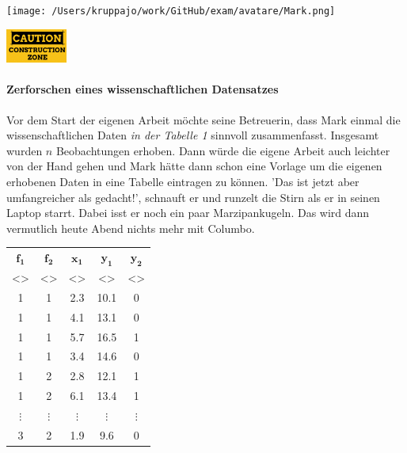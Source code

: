 \documentclass[a4paper, 9pt]{scrartcl}\usepackage[]{graphicx}\usepackage[]{xcolor}
\begin{document}
 
\ifcollection
\begin{flushright}
\tiny\vspace{-3Ex}
\textbf{\examinhaltstart}
\exammodulebiostat
\vspace{-4Ex}
\end{flushright}
\begin{minipage}[t]{0.5\textwidth}
\texttt{[image: /Users/kruppajo/work/GitHub/exam/avatare/Mark.png]}
\end{minipage}
\begin{minipage}[t]{0.5\textwidth}
\hfill
\href{https://youtu.be/C9skfFRTHhI}{\includegraphics[width = 2cm]{img/caution}}
\end{minipage}
\fi



\ifcollection
\paragraph{Zerforschen eines wissenschaftlichen Datensatzes}
\fi

Vor dem Start der eigenen Arbeit möchte seine Betreuerin, dass Mark einmal die wissenschaftlichen Daten \textit{in der Tabelle 1} sinnvoll zusammenfasst. Insgesamt wurden $n$ Beobachtungen erhoben. Dann würde die eigene Arbeit auch leichter von der Hand gehen und Mark hätte dann schon eine Vorlage um die eigenen erhobenen Daten in eine Tabelle eintragen zu können. 'Das ist jetzt aber umfangreicher als gedacht!', schnauft er und runzelt die Stirn als er in seinen Laptop starrt. Dabei isst er noch ein paar Marzipankugeln. Das wird dann vermutlich heute Abend nichts mehr mit Columbo.

\begin{table}[h]
\centering
\Large
  \begin{tabular}{ccccc}
  \toprule
   $\boldsymbol{f_1}$  & $\boldsymbol{f_2}$ & $\boldsymbol{x_1}$ & $\boldsymbol{y_1}$ & $\boldsymbol{y_2}$ \\[2pt]
     <\phantom{xxx}>  & <\phantom{xxx}> & <\phantom{xxx}> & <\phantom{xxx}> & <\phantom{xxx}> \\[2pt] 
  \midrule
  1  & 1 & 2.3 & 10.1 & 0 \\  
  1  & 1 & 4.1 & 13.1 & 0 \\ 
  1  & 1 & 5.7 & 16.5 & 1 \\ 
  1  & 1 & 3.4 & 14.6 & 0 \\
  1  & 2 & 2.8 & 12.1 & 1 \\
  1  & 2 & 6.1 & 13.4 & 1 \\
  $\vdots$  & $\vdots$ & $\vdots$ & $\vdots$ & $\vdots$\\
  3 & 2  & 1.9 & 9.6 &  0\\
  \bottomrule
  \end{tabular}
\end{table}
\end{document}
